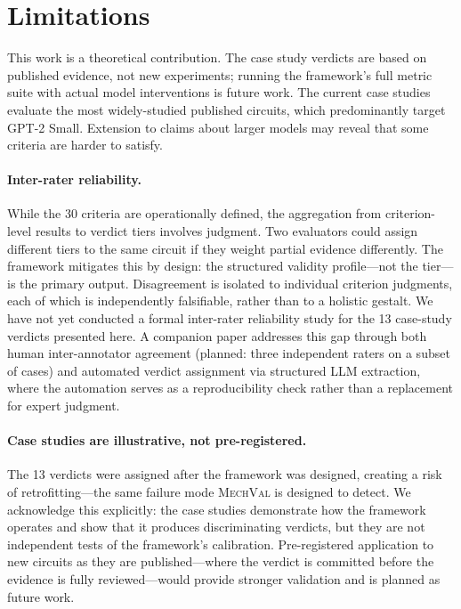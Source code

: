 \documentclass{article}
\newcommand{\mechval}{\textsc{MechVal}}
\begin{document}
\section{Limitations}
\label{sec:limitations}

This work is a theoretical contribution. The case study verdicts are based on published evidence, not new experiments; running the framework's full metric suite with actual model interventions is future work. The current case studies evaluate the most widely-studied published circuits, which predominantly target GPT-2 Small. Extension to claims about larger models may reveal that some criteria are harder to satisfy.

\paragraph{Inter-rater reliability.} While the 30 criteria are operationally defined, the aggregation from criterion-level results to verdict tiers involves judgment. Two evaluators could assign different tiers to the same circuit if they weight partial evidence differently. The framework mitigates this by design: the structured validity profile---not the tier---is the primary output. Disagreement is isolated to individual criterion judgments, each of which is independently falsifiable, rather than to a holistic gestalt. We have not yet conducted a formal inter-rater reliability study for the 13 case-study verdicts presented here. A companion paper addresses this gap through both human inter-annotator agreement (planned: three independent raters on a subset of cases) and automated verdict assignment via structured LLM extraction, where the automation serves as a reproducibility check rather than a replacement for expert judgment.

\paragraph{Case studies are illustrative, not pre-registered.} The 13 verdicts were assigned after the framework was designed, creating a risk of retrofitting---the same failure mode \mechval{} is designed to detect. We acknowledge this explicitly: the case studies demonstrate how the framework operates and show that it produces discriminating verdicts, but they are not independent tests of the framework's calibration. Pre-registered application to new circuits as they are published---where the verdict is committed before the evidence is fully reviewed---would provide stronger validation and is planned as future work.
\end{document}
